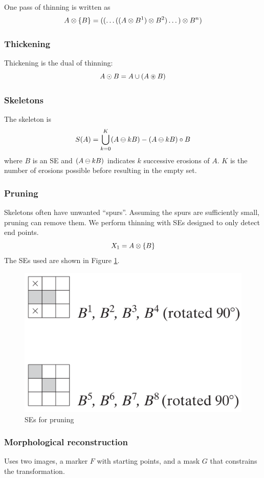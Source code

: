 One pass of thinning is written as
\begin{equation}
    A \otimes \{ B \} = ((\dots ((A \otimes B^1) \otimes B^2) \dots ) \otimes B^n)
\end{equation}

\subsubsection{Thickening}
Thickening is the dual of thinning:
\begin{equation}
    A \odot B = A \cup (A \circledast B)
\end{equation}

\subsubsection{Skeletons}
The skeleton is
\begin{equation}
    S(A) = \bigcup_{k=0}^{K} (A \ominus kB) - (A \ominus kB) \circ B
\end{equation}
where $B$ is an SE and $(A \ominus kB)$ indicates $k$ successive erosions of $A$. $K$ is the number of erosions possible before resulting in the empty set.

\subsubsection{Pruning}
Skeletons often have unwanted ``spurs''. Assuming the spurs are sufficiently small, pruning can remove them. We perform thinning with SEs designed to only detect end points.
\begin{equation}
    X_1 = A \otimes \{B\}
\end{equation}
The SEs used are shown in Figure \ref{fig:se-for-pruning}.

\begin{figure}[htbp]
    \centering
    \includegraphics[width=0.5\linewidth]{images/SE-for-pruning.PNG}
    \caption{SEs for pruning}
    \label{fig:se-for-pruning}
\end{figure}

\subsubsection{Morphological reconstruction}
Uses two images, a marker $F$ with starting points, and a mask $G$ that constrains the transformation.

